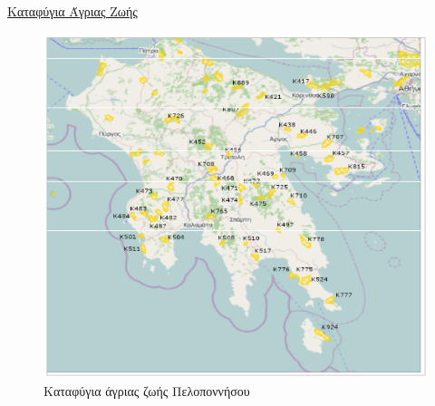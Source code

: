 \documentclass[12pt]{article}
\begin{document}
	\underline{Καταφύγια Άγριας Ζωής}
	\begin{figure} [H]
		\begin{center}
			\includegraphics [scale = 0.90] {katafigia.png}
			\caption{Καταφύγια άγριας ζωής Πελοποννήσου}
		\end{center}
	\end{figure}
\end{document}

